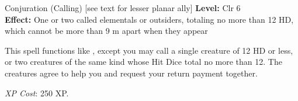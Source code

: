 {Conjuration (Calling) [see text for lesser planar ally]}
{
	\textbf{Level:}
	Clr 6\\
	\textbf{Effect:}
	One or two called elementals or outsiders, totaling no more than 12 HD, which cannot be more than 9 m apart when they appear\\
}
{
	This spell functions like , except you may call a single creature of 12 HD or less, or two creatures of the same kind whose Hit Dice total no more than 12. The creatures agree to help you and request your return payment together.

	\textit{XP Cost}:
	250 XP.

}
